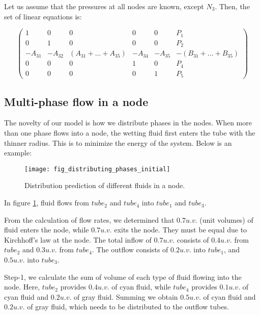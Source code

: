 	Let us assume that the pressures at all nodes are known, except $N_3$. Then, the set of linear equations is:
	
	\begin{equation} \label{eq:matrix-open-sys-5-nodes}
		\begin{pmatrix}
			1 & 0 & 0 & 0 & 0 & P_{1}\\
			0 & 1 & 0 & 0 & 0 & P_{2}\\
			-A_{31} & -A_{32} & (A_{31} + ... + A_{35}) & -A_{34} & -A_{35} & -(B_{31} + ... + B_{35})\\
			0 & 0 & 0 & 1 & 0 & P_{4}\\
			0 & 0 & 0 & 0 & 1 & P_{5}
		\end{pmatrix}
	\end{equation}
	
\subsection{Multi-phase flow in a node} \label{sec:multi-phase-flow}
	The novelty of our model is how we distribute phases in the nodes. When more than one phase flows into a node, the wetting fluid first enters the tube with the thinner radius. This is to minimize the energy of the system. Below is an example:
	
	\begin{figure}[H]
		\centering
		\texttt{[image: fig\_distributing\_phases\_initial]}
		\caption{Distribution prediction of different fluids in a node.}
		\label{fig:distributing_phases_initial}
	\end{figure}
	
	In figure \ref{fig:distributing_phases_initial}, fluid flows from ${tube}_2$ and ${tube}_4$ into ${tube}_1$ and ${tube}_3$. 

	From the calculation of flow rates, we determined that $0.7 u.v.$ (unit volumes) of fluid enters the node, while $0.7 u.v.$ exits the node. They must be equal due to Kirchhoff's law at the node. The total inflow of $0.7 u.v.$ consists of $0.4 u.v.$ from ${tube}_2$ and $0.3 u.v.$ from ${tube}_4$. The outflow consists of $0.2 u.v.$ into ${tube}_1$, and $0.5 u.v.$ into ${tube}_3$.
	
	Step-1, we calculate the sum of volume of each type of fluid flowing into the node. Here, ${tube}_2$ provides $0.4 u.v.$ of cyan fluid, while ${tube}_4$ provides $0.1 u.v.$ of cyan fluid and $0.2 u.v.$ of gray fluid. Summing we obtain $0.5 u.v.$ of cyan fluid and $0.2 u.v.$ of gray fluid, which needs to be distributed to the outflow tubes.
	
